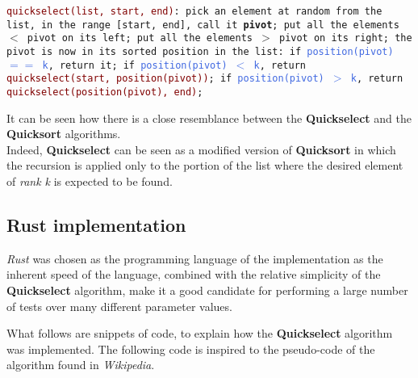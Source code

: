 \documentclass[
12pt,
a4paper,
oneside,
headinclude,
footinclude]{article}
\begin{document}
\texttt {\textcolor{Maroon}{quickselect(list, start, end)}: \newline
	\null\quad\quad pick an element at random from the list, \newline
    \null\quad\quad\quad\quad in the range [start, end], call it \textbf{pivot}; \newline
	\null\quad\quad put all the elements $<$ pivot on its left; \newline
	\null\quad\quad put all the elements $>$ pivot on its right; \newline
    \null\quad\quad the pivot is now in its sorted position in the list: \newline
    \null\quad\quad\quad\quad if \textcolor{RoyalBlue}{position(pivot) $==$ k}, return it; \newline
    \null\quad\quad\quad\quad if \textcolor{RoyalBlue}{position(pivot) $<$ k}, return \textcolor{Maroon}{quickselect(start, position(pivot))}; \newline
    \null\quad\quad\quad\quad if \textcolor{RoyalBlue}{position(pivot) $>$ k}, return \textcolor{Maroon}{quickselect(position(pivot), end)}; \newline}

It can be seen how there is a close resemblance between the \textbf{Quickselect} and the \textbf{Quicksort} algorithms. \\
Indeed, \textbf{Quickselect} can be seen as a modified version of \textbf{Quicksort} in which the recursion is applied only to the portion of the list where the desired element of \textit{rank k} is expected to be found.

\vspace{-5mm}
\subsection{Rust implementation}
\vspace{-5mm}
\textit{Rust} was chosen as the programming language of the implementation as the inherent speed of the language, combined with the relative simplicity of the \textbf{Quickselect} algorithm, make it a good candidate for performing a large number of tests over many different parameter values.

What follows are snippets of code, to explain how the \textbf{Quickselect} algorithm was implemented.
The following code is inspired to the pseudo-code of the algorithm found in \textit{Wikipedia}. \cite{quickselect_wiki}
\end{document}
